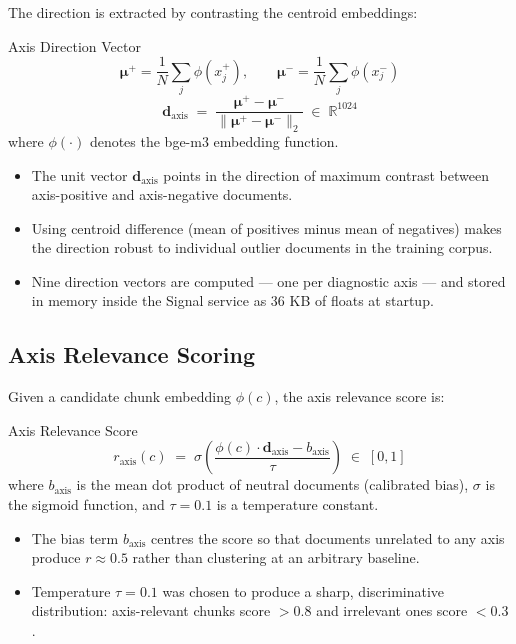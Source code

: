 \documentclass[11pt,a4paper]{article}
\begin{document}
The direction is extracted by contrasting the centroid embeddings:

\begin{mathbox}{Axis Direction Vector}
\[
  \boldsymbol{\mu}^+ = \frac{1}{N}\!\sum_j \phi(x_j^+),
  \qquad
  \boldsymbol{\mu}^- = \frac{1}{N}\!\sum_j \phi(x_j^-)
\]
\[
  \mathbf{d}_\text{axis} \;=\;
  \frac{\boldsymbol{\mu}^+ - \boldsymbol{\mu}^-}{\|\boldsymbol{\mu}^+ - \boldsymbol{\mu}^-\|_2}
  \;\in\; \mathbb{R}^{1024}
\]
where $\phi(\cdot)$ denotes the bge-m3 embedding function.
\end{mathbox}

\begin{itemize}
  \item The unit vector $\mathbf{d}_\text{axis}$ points in the direction of maximum contrast
        between axis-positive and axis-negative documents.
  \item Using centroid difference (mean of positives minus mean of negatives) makes the
        direction robust to individual outlier documents in the training corpus.
  \item Nine direction vectors are computed — one per diagnostic axis — and stored
        in memory inside the Signal service as 36 KB of floats at startup.
\end{itemize}

\subsection{Axis Relevance Scoring}

Given a candidate chunk embedding $\phi(c)$, the axis relevance score is:

\begin{mathbox}{Axis Relevance Score}
\[
  r_\text{axis}(c) \;=\;
  \sigma\!\!\left(\frac{\phi(c)\cdot\mathbf{d}_\text{axis} - b_\text{axis}}{\tau}\right)
  \;\in\; [0,1]
\]
where $b_\text{axis}$ is the mean dot product of neutral documents (calibrated bias),
$\sigma$ is the sigmoid function, and $\tau = 0.1$ is a temperature constant.
\end{mathbox}

\begin{itemize}
  \item The bias term $b_\text{axis}$ centres the score so that documents unrelated to any
        axis produce $r \approx 0.5$ rather than clustering at an arbitrary baseline.
  \item Temperature $\tau = 0.1$ was chosen to produce a sharp, discriminative distribution:
        axis-relevant chunks score $>0.8$ and irrelevant ones score $<0.3$.
\end{itemize}
\end{document}
